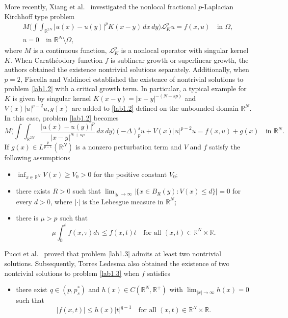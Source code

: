 \documentclass[10pt,a4paper]{amsart}
\numberwithin{equation}{section}
\begin{document}
More recently, Xiang et al.\  \cite{r31} investigated the  nonlocal fractional 
$p$-Laplacian Kirchhoff type problem
\begin{equation}\label{lab1.2}
\begin{gathered}
M\Big(\int\int_{\mathbb{R}^{2N}}|u(x)-u(y)|^p K(x-y)\,dx\,dy\Big)
\mathcal{L}_K^pu=f(x,u)\quad \text{in }\Omega, \\
u=0\quad \text{in }\mathbb{R}^N\setminus\Omega,
\end{gathered}
\end{equation}
where $M$ is a continuous function, $\mathcal{L}_K^p$ is a nonlocal operator with 
singular kernel $K$. When Carath\'{e}odory function $f$ is sublinear growth 
or superlinear growth, the authors obtained the existence nontrivial solutions 
separately. Additionally, when $p=2$, Fiscella and Valdinoci  \cite{r8} established 
the existence of nontrivial solutions to problem \eqref{lab1.2} with a critical 
growth term. In particular, a typical example for $K$ is given by singular kernel 
$K(x-y)=|x-y|^{-(N+sp)}$ and $V(x)|u|^{p-2}u, g(x)$ are added to \eqref{lab1.2} 
defined on the unbounded domain $\mathbb{R}^N$. In this case, problem \eqref{lab1.2} 
becomes
\begin{equation}\label{lab1.3}
M\Big(\int\int_{\mathbb{R}^{2N}}\frac{|u(x)-u(y)|^p}{|x-y|^{N+sp}}\,dx\,dy\Big)
(-\Delta)_p^s u+V(x)|u|^{p-2}u=f(x,u)+g(x)\quad \text{in }\mathbb{R}^N.
\end{equation}
If $g(x)\in L^{\frac{p}{p-1}}(\mathbb{R}^N)$ is a nonzero perturbation term and 
$V$ and $f$ satisfy the following assumptions
\begin{itemize}
\item[(1)] $\inf_{x\in\mathbb{R}^N}V(x)\geq V_0>0$ for the positive constant $V_0$;

\item[(2)] there exists $R>0$ such that $\lim_{|y|\to \infty}|
\{x\in B_{R}(y): V(x)\leq d \} |=0$ for every $d>0$,
where $|\cdot|$ is the Lebesgue measure in $\mathbb{R}^N$;

\item[(3)] there is $\mu>p$ such that
\[
 \mu \int_0^tf(x,\tau)d\tau\leq f(x,t)t \quad \text{for all }  
 (x, t)\in \mathbb{R}^N\times\mathbb{R}.
\]
\end{itemize}
Pucci et al.\  \cite{r19} proved that problem \eqref{lab1.3} admits at least two 
nontrivial solutions. Subsequently, Torres Ledesma  \cite{r26} also obtained the 
existence of two nontrivial solutions to problem \eqref{lab1.3} when $f$ satisfies
\begin{itemize}
\item[(4)] there exist $q\in(p, p^*_s)$ and $h(x)\in C(\mathbb{R}^N, \mathbb{R}^+)$ 
with $\lim_{|x|\to \infty}h(x)=0$ such that
\[
 |f(x,t)|\leq h(x)|t|^{q-1} \quad \text{for all } 
  (x, t)\in \mathbb{R}^N\times\mathbb{R}.
\]
\end{itemize}
\end{document}
